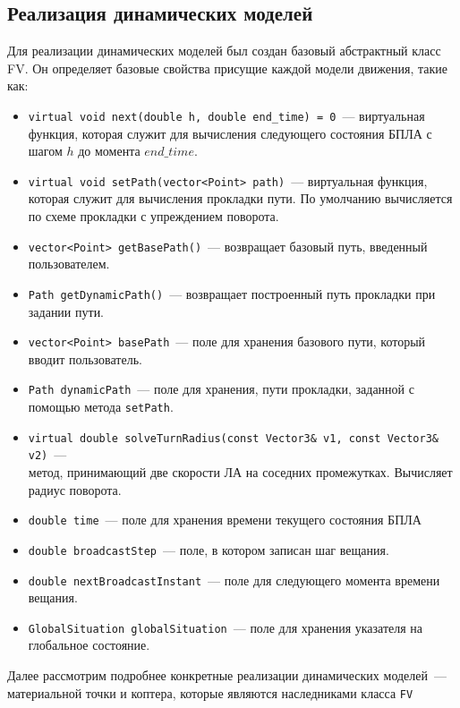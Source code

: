 \documentclass[a4paper,12pt]{article}
\begin{document}
\subsection{Реализация динамических моделей}
Для реализации динамических моделей был создан базовый абстрактный класс FV. Он определяет базовые свойства присущие каждой модели движения, такие как:
\begin{itemize}
    \item     \texttt{virtual void next(double h, double end\_time) = 0}~--- виртуальная функция, которая служит для вычисления следующего состояния БПЛА с шагом $h$ до момента $end\_time$.
    \item \texttt{virtual void setPath(vector<Point> path)}~--- виртуальная функция, которая служит для вычисления прокладки пути. По умолчанию вычисляется по схеме прокладки с упреждением поворота.
    \item \texttt{vector<Point> getBasePath()}~--- возвращает базовый путь, введенный пользователем.
    \item \texttt{Path getDynamicPath()}~--- возвращает построенный путь прокладки при задании пути.
    \item \texttt{vector<Point> basePath}~--- поле для хранения базового пути, который вводит пользователь.
    \item \texttt{Path dynamicPath}~--- поле для хранения, пути прокладки, заданной с помощью метода  \texttt{setPath}.
    \item \texttt{virtual double solveTurnRadius(const Vector3\& v1, const Vector3\& v2)}~---\\ метод,  принимающий две скорости ЛА на соседних промежутках. Вычисляет радиус поворота.
    \item \texttt{double time}~--- поле для хранения времени текущего состояния БПЛА
     \item \texttt{double broadсastStep}~--- поле, в котором записан шаг вещания.
      \item \texttt{double nextBroadcastInstant}~--- поле для следующего момента времени вещания.
    \item \texttt{GlobalSituation\* globalSituation}~--- поле для хранения указателя на глобальное состояние.
\end{itemize}
Далее рассмотрим подробнее конкретные реализации динамических моделей~--- материальной точки и коптера, которые являются наследниками класса \texttt{FV}
\end{document}
